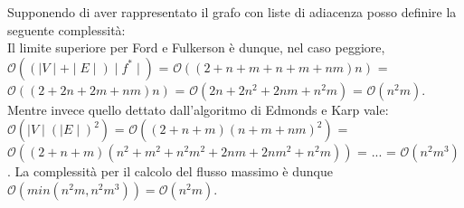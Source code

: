 \documentclass[../cheatSheetAlgoritmi.tex]{subfiles}
\begin{document}
Supponendo di aver rappresentato il grafo con liste di adiacenza posso definire la seguente complessità: \\
Il limite superiore per Ford e Fulkerson è dunque, nel caso peggiore, $\mathcal{O}((\mid V \mid + \mid E \mid) \mid f^* \mid)$ = $\mathcal{O}((2 + n + m + n + m + nm) n)$ = $\mathcal{O}((2 + 2n + 2m + nm) n)$ = $\mathcal{O}(2n + 2n^2 + 2nm + n^2m)$ = $\mathcal{O}(n^2m)$. \\
Mentre invece quello dettato dall'algoritmo di Edmonds e Karp vale: $\mathcal{O}(\mid V \mid (\mid E \mid)^2)$ = $\mathcal{O}((2 + n + m)(n + m + nm)^2)$ = $\mathcal{O}((2 + n + m)(n^2 + m^2 + n^2m^2 + 2nm + 2nm^2 + n^2m))$ = ... = $\mathcal{O}(n^2m^3)$.
La complessità per il calcolo del flusso massimo è dunque $\mathcal{O}(min(n^2m, n^2m^3)) = \mathcal{O}(n^2m)$.
\newpage
\end{document}
